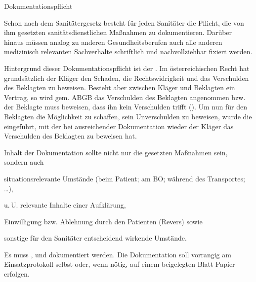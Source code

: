 {Dokumentationspflicht}
{\label{topic:dokumentationspflicht}%
\label{topic:dokumentation-rechtlich}%
Schon nach dem Sanitätergesetz besteht für jeden Sanitäter
die Pflicht, die von ihm gesetzten
sanitätsdienstlichen Maßnahmen zu
dokumentieren. Darüber hinaus müssen
analog zu anderen Gesundheitsberufen auch alle anderen
medizinisch relevanten Sachverhalte schriftlich und
nachvollziehbar fixiert werden.

Hintergrund dieser Dokumentationspflicht ist der
.
Im österreichischen Recht hat grundsätzlich der Kläger den
Schaden, die Rechtswidrigkeit und das Verschulden des
Beklagten zu beweisen. Besteht aber zwischen Kläger und
Beklagten ein Vertrag, so wird gem.  ABGB das
Verschulden des Beklagten angenommen bzw. der Beklagte muss
beweisen, dass ihn kein Verschulden trifft
().
Um nun für den Beklagten die Möglichkeit zu schaffen, sein
Unverschulden zu beweisen, wurde die
 eingeführt, mit der bei
ausreichender Dokumentation wieder der Kläger das
Verschulden des Beklagten zu beweisen hat.


Inhalt der Dokumentation sollte nicht nur die 
gesetzten Maßnahmen sein, sondern auch 
\begin{compactitem}
  \item situationsrelevante
  Umstände (beim Patient; am BO; während des Transportes;
  {\dots}),
  \item  u.\,U. relevante Inhalte einer Aufklärung,
  \item Einwilligung bzw. Ablehnung durch den Patienten
  (Revers) sowie
  \item sonstige für den Sanitäter entscheidend wirkende
  Umstände.
\end{compactitem}





Es muss ,  und
 dokumentiert werden.
Die Dokumentation soll vorrangig am Einsatzprotokoll selbst
oder, wenn nötig, auf einem beigelegten
Blatt Papier erfolgen.





}
{}
{}
{}
{}

